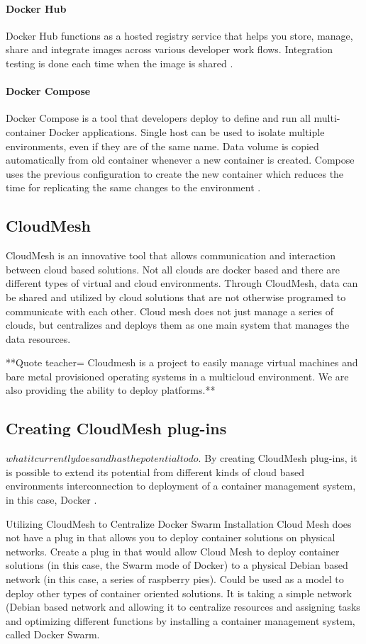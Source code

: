 \documentclass[sigconf]{acmart}
\begin{document}
	\paragraph{Docker Hub}
	Docker Hub functions as a hosted registry service that helps you store, manage, share and integrate images across various developer work flows. Integration testing is done each time when the image is shared \cite{hackernoon}.
	\paragraph{Docker Compose}
	Docker Compose is a tool that developers deploy to define and run all multi-container Docker applications. Single host can be used to isolate
	multiple environments, even if they are of the same name. Data volume is copied automatically from old container whenever a new container is created. Compose uses the previous configuration to create the new container which reduces the time for replicating the same changes to the environment \cite{hackernoon}.
	
	
	\subsection{CloudMesh}
	CloudMesh is an innovative tool that allows communication and interaction between cloud based solutions.  Not all clouds are docker based and there are different types of virtual and cloud environments. Through CloudMesh, data can be shared and utilized by cloud solutions that are not otherwise programed to communicate with each other.  Cloud mesh does not just manage a series of clouds, but centralizes and deploys them as one main system that manages the data resources.
	
	**Quote teacher=
	Cloudmesh is a project to easily manage virtual machines and bare metal provisioned operating systems in a multicloud environment. We are also providing the ability to deploy platforms.**
	
	\subsection{Creating CloudMesh plug-ins}
	$what it currently does and has the potential to do$.  
	By creating CloudMesh plug-ins, it is possible to  extend its potential from different kinds of cloud based environments interconnection to deployment of a container management system, in this case, Docker .  
	
	Utilizing CloudMesh to Centralize Docker Swarm Installation Cloud Mesh does not have a plug in that allows you to deploy container solutions on physical networks.  Create a plug in that would allow Cloud Mesh to deploy container solutions (in this case, the Swarm mode of Docker) to a physical Debian based network (in this case, a series of raspberry pies).  Could be used as a model to deploy other types of container oriented solutions.  It is taking a simple network (Debian based network and allowing it to centralize resources and assigning tasks and optimizing different functions by installing a container management system, called Docker Swarm.
	
\end{document}
